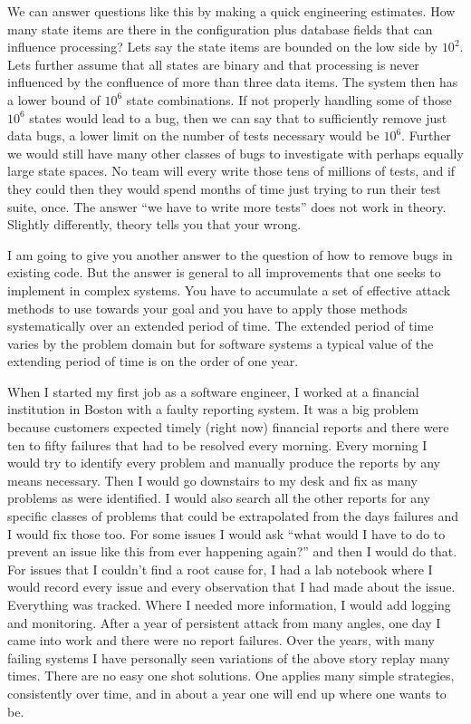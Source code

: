 We can answer questions like this by making a quick engineering estimates. How many state items are there in the configuration plus
database fields that can influence processing? Lets say the state items are bounded on the low side by $10^2$. Lets further assume
that all states are binary and
that processing is never influenced by the confluence of more than three data items. The system then has a lower bound of $10^6$ state combinations.
If not properly handling some of those $10^6$ states would lead to a bug, then we can say that to sufficiently
remove just data bugs, a lower limit on the number of tests necessary would be $10^6$. Further we would still have many other classes of bugs
to investigate with perhaps equally large state spaces. No team will every write those tens of millions of tests, and if they could then they would
spend months of time just trying to run their test suite, once. The answer ``we have to write more tests'' does not work in theory. Slightly differently,
theory tells you that your wrong.

I am going to give you another answer to the question of how to remove bugs in existing code. But the answer is general to all improvements
that one seeks to implement in complex systems. You have to accumulate a set of effective attack methods to use towards your goal and
you have to apply those methods systematically over an extended period of time. The extended period of time varies by the problem domain
but for software systems a typical value of the extending period of time is on the order of one year.

When I started my first job as a software engineer, I worked at a financial institution in Boston with a faulty reporting system. It was a big
problem because customers expected timely (right now) financial reports and there were ten to fifty failures that had to be resolved every morning. Every
morning I would try to identify every problem and manually produce the reports by any means necessary. Then I would go downstairs to my
desk and fix as many problems as were identified. I would also search all the other reports for any specific classes of problems that could be
extrapolated from the days failures and I would fix those too. For some issues I would ask ``what would I have to do to prevent an issue like
this from ever happening again?'' and then I would do that. For issues that I couldn't find a root cause for, I had a lab notebook where I
would record every issue and every observation that I had made about the issue. Everything was tracked. Where I needed more information,
I would add logging and monitoring. After a year of persistent attack from many angles, one day I came into work and there were no report
failures. Over the years, with many failing systems I have personally seen variations of the above story replay many times. There are no easy one
shot solutions. One applies many simple strategies, consistently over time, and in about a year one will end up where one wants to be.

